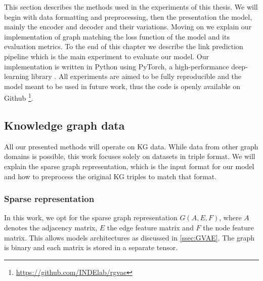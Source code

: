 This section describes the methods used in the experiments of this thesis. We will begin with data formatting and preprocessing, then the presentation the model, mainly the encoder and decoder and their variations. Moving on we explain our implementation of graph matching the loss function of the model and its evaluation metrics. To the end of this chapter we describe the link prediction pipeline which is the main experiment to evaluate our model. Our implementation is written in Python using PyTorch, a high-performance deep-learning library \cite{paszke_pytorch_2019}. All experiments are aimed to be fully reproducible and the model meant to be used in future work, thus the code is openly available on Github \footnote{\url{https://github.com/INDElab/rgvae}}.

\subsection{Knowledge graph data}
All our presented methods will operate on KG data. While data from other graph domains is possible, this work focuses solely on datasets in triple format. We will explain the sparse graph representation, which is the input format for our model and how to preprocess the original KG triples to match that format.

\subsubsection{Sparse representation}


In this work, we opt for the sparse graph representation $G(A,E,F)$, where $A$ denotes the adjacency matrix, $E$ the edge feature matrix and $F$ the node feature matrix. This allows models architectures as discussed in \ref{ssec:GVAE}. The graph is binary and each matrix is stored in a separate tensor.

